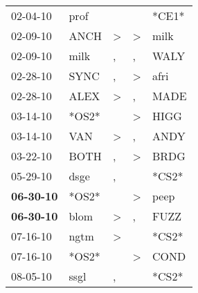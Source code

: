 \begin{supertabular}{p{0.07\textwidth}p{0.06\textwidth}p{0.02\textwidth}p{0.02\textwidth}p{0.06\textwidth}}
          02-04-10\textsuperscript{} &           prof\textsuperscript{} &                  &                  &                            *CE1* \\
          02-09-10\textsuperscript{} &           ANCH\textsuperscript{} &     \textgreater &     \textgreater &           milk\textsuperscript{} \\
          02-09-10\textsuperscript{} &           milk\textsuperscript{} &                , &                , &           WALY\textsuperscript{} \\
          02-28-10\textsuperscript{} &           SYNC\textsuperscript{} &                , &     \textgreater &           afri\textsuperscript{} \\
          02-28-10\textsuperscript{} &           ALEX\textsuperscript{} &     \textgreater &                , &           MADE\textsuperscript{} \\
          03-14-10\textsuperscript{} &                            *OS2* &                  &     \textgreater &           HIGG\textsuperscript{} \\
          03-14-10\textsuperscript{} &            VAN\textsuperscript{} &     \textgreater &                , &           ANDY\textsuperscript{} \\
          03-22-10\textsuperscript{} &           BOTH\textsuperscript{} &                , &     \textgreater &           BRDG\textsuperscript{} \\
          05-29-10\textsuperscript{} &           dsge\textsuperscript{} &                , &                  &                            *CS2* \\
 \textbf{06-30-10\textsuperscript{}} &                            *OS2* &                  &     \textgreater &           peep\textsuperscript{} \\
 \textbf{06-30-10\textsuperscript{}} &           blom\textsuperscript{} &     \textgreater &                , &           FUZZ\textsuperscript{} \\
          07-16-10\textsuperscript{} &           ngtm\textsuperscript{} &     \textgreater &                  &                            *CS2* \\
          07-16-10\textsuperscript{} &                            *OS2* &                  &     \textgreater &           COND\textsuperscript{} \\
          08-05-10\textsuperscript{} &           ssgl\textsuperscript{} &                , &                  &                            *CS2* \\

\end{supertabular}
